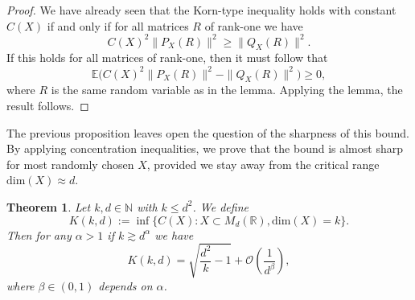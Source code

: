 \documentclass[11pt, a4paper, reqno]{elsarticle}
\newtheorem{theorem}{Theorem}[section]
\theoremstyle{definition}
\theoremstyle{remark}
\begin{document}
\begin{proof}
We have already seen that the Korn-type inequality holds
with constant $C(X)$ if and only if for all matrices $R$
of rank-one we have
\begin{equation*}
    C(X)^2\|P_X(R)\|^2\ge \|Q_X(R)\|^2.
\end{equation*}
If this holds for all matrices of rank-one, then it must follow that
\begin{equation*}
    \mathbb E\biggl(C(X)^2\|P_X(R)\|^2-\|Q_X(R)\|^2\biggr)\ge 0,
\end{equation*}
where $R$ is the same random variable as in the lemma.
Applying the lemma, the result follows.
\end{proof}
The previous proposition leaves open the question
of the sharpness of this bound. By applying concentration
inequalities, we prove that the bound is almost 
sharp for most randomly chosen $X$, 
provided we stay away from the critical range $\mathrm{dim}(X)\approx d$.
\begin{theorem}\label{thm : optimalconcentration}
    Let $k,d\in \mathbb{N}$ with $k\le d^2$. We define
    \begin{equation*}
        K(k,d):=\inf \biggl\{C(X)\colon X\subset M_d(\mathbb{R}), \mathrm{dim}(X)=k\biggr\}.
    \end{equation*}
    Then for any $\alpha>1$ if $k\gtrsim d^\alpha$ we have
    \begin{equation*}
        K(k,d)= \sqrt{\frac{d^2}{k}-1}+\mathcal O\left(\frac1{d^\beta}\right),
    \end{equation*}
    where $\beta\in(0,1)$ depends on $\alpha$.
\end{theorem}
\end{document}
